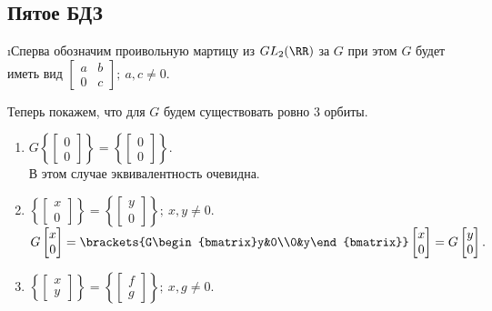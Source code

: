 \subsection{Пятое БДЗ}


\i Сперва обозначим проивольную мартицу из $GL_2(\RR)$ за $G$ при этом $G$ будет иметь вид $\begin{bmatrix} a & b\\ 0&c \end{bmatrix};\ a,c \ne 0$.
\par Теперь покажем, что для $G$ будем существовать ровно 3 орбиты.
\begin{enumerate}
    \item $G \left\{\begin{bmatrix}0\\0\end{bmatrix}\right\} = \left\{\begin{bmatrix}0\\0\end{bmatrix}\right\}$.\\
    В этом случае эквивалентность очевидна.
    \item $\left\{\begin{bmatrix}x\\0\end{bmatrix}\right\} = \left\{\begin{bmatrix}y\\0\end{bmatrix}\right\};\ x,y \ne 0.$\\
    $G \begin{bmatrix}x\\0\end{bmatrix} = \brackets{G\begin{bmatrix}y&0\\0&y\end{bmatrix}} \begin{bmatrix}x\\0\end{bmatrix} = G\begin{bmatrix}y\\0\end{bmatrix}.$
    \item $\left\{\begin{bmatrix}x\\y\end{bmatrix}\right\} = \left\{\begin{bmatrix}f\\g\end{bmatrix}\right\};\ x,g \ne 0.$\\

\end{enumerate}
